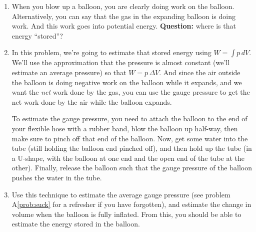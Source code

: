 \begin{exercise}
  \begin{enumerate}
  \item When you blow up a balloon, you are clearly doing work on the
    balloon.  Alternatively, you can say that the gas in the expanding
    balloon is doing work.  And this work goes into potential energy.
    \textbf{Question:} where is that energy ``stored''?

  \item In this problem, we're going to estimate that stored energy
    using $W = \int p\, dV$.  We'll use the approximation that the
    pressure is almost constant (we'll estimate an average pressure)
    so that $W= p\, \Delta V$.  And since the air outside the balloon
    is doing negative work on the balloon while it expands, and we
    want the \emph{net} work done by the gas, you can use the gauge
    pressure to get the net work done by the air while the balloon
    expands.

    To estimate the gauge pressure, you need to attach the balloon to
    the end of your flexible hose with a rubber band, blow the balloon
    up half-way, then make sure to pinch off that end of the balloon.
    Now, get some water into the tube (still holding the balloon end
    pinched off), and then hold up the tube (in a U-shape, with the
    balloon at one end and the open end of the tube at the other).
    Finally, release the balloon such that the gauge pressure of the
    balloon pushes the water in the tube.

  \item Use this technique to estimate the average gauge pressure (see
    problem A\ref{prob:suck} for a refresher if you have forgotten),
    and estimate the change in volume when the balloon is fully
    inflated.  From this, you should be able to estimate the energy
    stored in the balloon.
  \end{enumerate}
\end{exercise}



